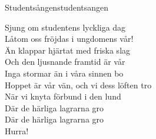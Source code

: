 \begin{song}{Studentsången}{studentsangen}

\begin{vers}
Sjung om studentens lyckliga dag\\
Låtom oss fröjdas i ungdomens vår!\\
Än klappar hjärtat med friska slag\\
Och den ljusnande framtid är vår\\
Inga stormar än i våra sinnen bo\\
Hoppet är vår vän, och vi dess löften tro\\
När vi knyta förbund i den lund\\
Där de härliga lagrarna gro\\
Där de härliga lagrarna gro\\
Hurra!\\
\end{vers}
\end{song}
